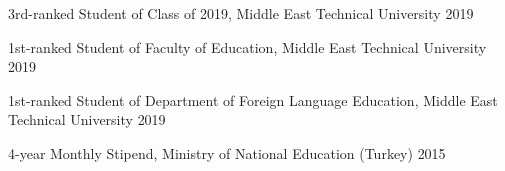 
\begin{cvhonors}


    \cvhonor
    {3rd-ranked Student of Class of 2019,} %
    {Middle East Technical University} %
    {} %
    {2019} %
    
    \cvhonor
    {1st-ranked Student of Faculty of Education,} %
    {Middle East Technical University} %
    {} %
    {2019} %
    
    \cvhonor
    {1st-ranked Student of Department of Foreign Language Education,} %
    {Middle East Technical University} %
    {} %
    {2019} %

    \cvhonor
    {4-year Monthly Stipend,} %
    {Ministry of National Education (Turkey)} %
    {} %
    {2015} %

\end{cvhonors}
